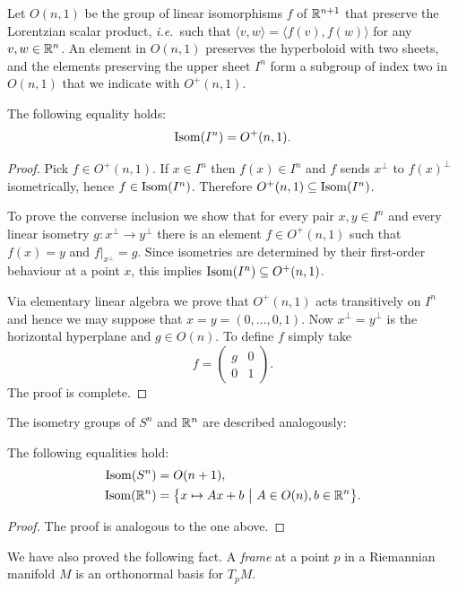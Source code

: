 Let $O(n,1)$ be the group of linear isomorphisms $f$ of $\mathbb{R}^{n+1}$ that preserve the Lorentzian scalar product, \emph{i.e.}~such that $\langle v,w\rangle = \langle f(v),  f(w) \rangle$ for any $v,w \in \mathbb{R}^n$. An element in $O(n,1)$ preserves the hyperboloid with two sheets, and the elements preserving the upper sheet $I^n$ form a subgroup of index two in $O(n,1)$ that we indicate with $O^+(n,1)$.

\begin{prop} \label{isom:prop}
The following equality holds:
$${\rm Isom} (I^n) = O^+(n,1).$$
\end{prop}
\begin{proof}
Pick $f\in O^+(n,1)$. If $x\in I^n$ then $f(x) \in I^n$ and $f$ sends $x^\bot$ to $f(x)^\bot$ isometrically, hence $f \in{\rm Isom} (I^n)$. Therefore $O^+(n,1) \subseteq {\rm Isom} (I^n)$.

To prove the converse inclusion we show that for every pair $x,y \in I^n$ and every
linear isometry $g\colon x^\bot \to y^\bot$ there is an element $f\in O^+(n,1)$ such that $f(x)=y$ and $f|_{x^\bot} = g$. Since isometries are determined by their first-order behaviour at a point $x$, this implies ${\rm Isom}(I^n) \subseteq O^+(n,1)$.

Via elementary linear algebra we prove that $O^+(n,1)$ acts transitively on $I^n$ and hence we may suppose that $x=y=(0,\ldots,0,1)$. Now $x^\bot = y^\bot$ is the horizontal hyperplane and $g\in O(n)$.  To define $f$ simply take
$$f = \begin{pmatrix} g & 0 \\ 0 & 1 \end{pmatrix}.$$
The proof is complete.
\end{proof}

The isometry groups of $S^n$ and $\mathbb{R}^n$ are described analogously:
\begin{prop} \label{isom2:prop}
The following equalities hold:
\begin{align*}
{\rm Isom}(S^n) & = O(n+1), \\
{\rm Isom}(\mathbb{R}^n) & = \big\{x \mapsto Ax+b\ \big| \ A\in O(n), b \in \mathbb{R}^n\big\}.
\end{align*}
\end{prop}
\begin{proof}
The proof is analogous to the one above.
\end{proof}

We have also proved the following fact. A \emph{frame} at a point $p$ in a Riemannian manifold $M$ is an orthonormal basis for $T_pM$.

